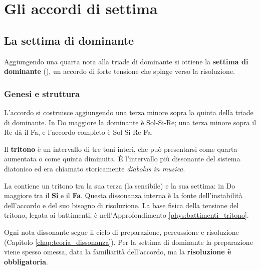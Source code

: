 \part{Gli accordi di settima}

\chapter{La settima di dominante}
\label{chap:settima_dominante}

Aggiungendo una quarta nota alla triade di dominante si ottiene la \textbf{settima di dominante} (), un accordo di forte tensione che spinge verso la risoluzione.

\section{Genesi e struttura}
\label{sec:genesi_v7}

L'accordo si costruisce aggiungendo una terza minore sopra la quinta della triade di dominante. In Do maggiore la dominante è Sol-Si-Re; una terza minore sopra il Re dà il Fa, e l'accordo completo è Sol-Si-Re-Fa.

\begin{definizione}[Il tritono]
	\label{def:tritono}
	Il \textbf{tritono} è un intervallo di tre toni interi, che può presentarsi come quarta aumentata o come quinta diminuita. È l'intervallo più dissonante del sistema diatonico ed era chiamato storicamente \textit{diabolus in musica}.
\end{definizione}

La  contiene un tritono tra la sua terza (la sensibile) e la sua settima: in Do maggiore tra il \textbf{Si} e il \textbf{Fa}. Questa dissonanza interna è la fonte dell'instabilità dell'accordo e del suo bisogno di risoluzione. La base fisica della tensione del tritono, legata ai battimenti, è nell'Approfondimento \ref{phys:battimenti_tritono}.

\begin{esempio}
	\label{ex:tritono_v7}
\end{esempio}

\begin{regola}
	\label{reg:preparazione_risoluzione}
	Ogni nota dissonante segue il ciclo di preparazione, percussione e risoluzione (Capitolo \ref{chap:teoria_dissonanza}). Per la settima di dominante la preparazione viene spesso omessa, data la familiarità dell'accordo, ma la \textbf{risoluzione è obbligatoria}.
\end{regola}

